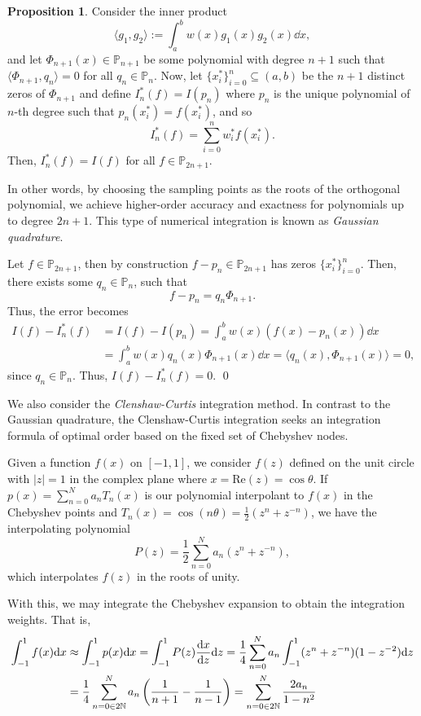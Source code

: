 \documentclass[
]{article}
\theoremstyle{definition}
\newtheorem{prop}{Proposition}
\theoremstyle{definition}
\begin{document}
\begin{prop}
Consider the inner product 
\[\langle g_1, g_2 \rangle := \int_a^b w(x)g_1(x)g_2(x) \dd x,\]
and let \(\Phi_{n + 1}(x) \in \mathbb{P}_{n + 1}\) be some polynomial with 
degree \(n + 1\) such that \(\langle \Phi_{n + 1}, q_n \rangle = 0\) for all 
\(q_n \in \mathbb{P}_n\). Now, let \(\{x_i^*\}_{i = 0}^n \subseteq (a, b)\) 
be the \(n + 1\) distinct zeros of \(\Phi_{n + 1}\) and define \(I_n^*(f) = I(p_n)\) 
where \(p_n\) is the unique polynomial of \(n\)-th degree such that \(p_n(x_i^*) = f(x_i^*)\), 
and so 
\[I_n^*(f) = \sum_{i = 0}^n w_i^*f(x_i^*).\]
Then, \(I_n^*(f) = I(f)\) for all \(f \in \mathbb{P}_{2n + 1}\). 
\end{prop}

In other words, by choosing the sampling points as the roots of the
orthogonal polynomial, we achieve higher-order accuracy and exactness
for polynomials up to degree \(2n + 1\). This type of numerical
integration is known as \emph{Gaussian quadrature}.

\proof

Let \(f \in \mathbb{P}_{2n + 1}\), then by construction
\(f - p_n \in \mathbb{P}_{2n + 1}\) has zeros \(\{x_i^*\}_{i = 0}^n\).
Then, there exists some \(q_n \in \mathbb{P}_n\), such that
\[f - p_n = q_n \Phi_{n + 1}.\] Thus, the error becomes \[\begin{split}
    I(f) - I_n^*(f) & = I(f) - I(p_n) = \int_a^b w(x)(f(x) - p_n(x)) \dd x \\
    & = \int_a^b w(x) q_n(x) \Phi_{n + 1}(x) \dd x = 
    \langle q_n(x), \Phi_{n + 1}(x) \rangle = 0,
  \end{split}\] since \(q_n \in \mathbb{P}_n\). Thus,
\(I(f) - I_n^*(f) = 0\). \qed 

We also consider the \emph{Clenshaw-Curtis} integration method. In
contrast to the Gaussian quadrature, the Clenshaw-Curtis integration
seeks an integration formula of optimal order based on the fixed set of
Chebyshev nodes.

Given a function \(f(x)\) on \([-1, 1]\), we consider \(f(z)\) defined
on the unit circle with \(|z| = 1\) in the complex plane where
\(x = \text{Re}(z) = \cos \theta\). If
\(p(x) = \sum_{n = 0}^N a_n T_n(x)\) is our polynomial interpolant to
\(f(x)\) in the Chebyshev points and
\(T_n(x) = \cos(n\theta) = \frac{1}{2}(z^n + z^{-n})\), we have the
interpolating polynomial
\[P(z) = \frac{1}{2} \sum_{n = 0}^N a_n(z^n + z^{- n}),\] which
interpolates \(f(z)\) in the roots of unity.

With this, we may integrate the Chebyshev expansion to obtain the
integration weights. That is, \[\begin{split}
  \int_{-1}^1 f(x) \dd x & \approx \int_{-1}^1 p(x) \dd x = \int_{-1}^1 P(z) \dv{x}{z} \dd z
  = \frac{1}{4} \sum_{n = 0}^N a_n \int_{-1}^1 (z^n + z^{-n})(1 - z^{-2}) \dd z\\
  & = \frac{1}{4}\sum_{n = 0 \in 2\mathbb{N}}^N a_n\left(\frac{1}{n + 1} - \frac{1}{n - 1}\right)
  = \sum_{n = 0 \in 2\mathbb{N}}^N \frac{2a_n}{1 - n^2}
\end{split}\]
\end{document}
